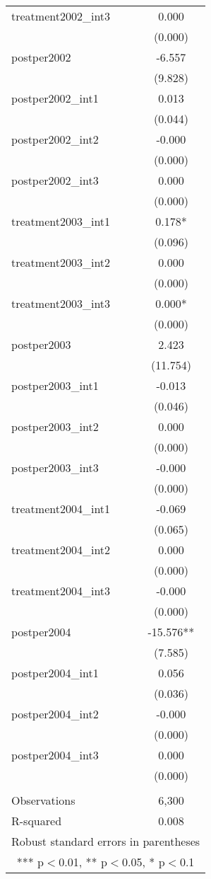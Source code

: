 \documentclass[]{article}
\begin{document}
\begin{tabular}{lc}
treatment2002\_int3 & 0.000 \\
 & (0.000) \\
postper2002 & -6.557 \\
 & (9.828) \\
postper2002\_int1 & 0.013 \\
 & (0.044) \\
postper2002\_int2 & -0.000 \\
 & (0.000) \\
postper2002\_int3 & 0.000 \\
 & (0.000) \\
treatment2003\_int1 & 0.178* \\
 & (0.096) \\
treatment2003\_int2 & 0.000 \\
 & (0.000) \\
treatment2003\_int3 & 0.000* \\
 & (0.000) \\
postper2003 & 2.423 \\
 & (11.754) \\
postper2003\_int1 & -0.013 \\
 & (0.046) \\
postper2003\_int2 & 0.000 \\
 & (0.000) \\
postper2003\_int3 & -0.000 \\
 & (0.000) \\
treatment2004\_int1 & -0.069 \\
 & (0.065) \\
treatment2004\_int2 & 0.000 \\
 & (0.000) \\
treatment2004\_int3 & -0.000 \\
 & (0.000) \\
postper2004 & -15.576** \\
 & (7.585) \\
postper2004\_int1 & 0.056 \\
 & (0.036) \\
postper2004\_int2 & -0.000 \\
 & (0.000) \\
postper2004\_int3 & 0.000 \\
 & (0.000) \\
 &  \\
Observations & 6,300 \\
 R-squared & 0.008 \\ \hline
\multicolumn{2}{c}{ Robust standard errors in parentheses} \\
\multicolumn{2}{c}{ *** p$<$0.01, ** p$<$0.05, * p$<$0.1} \\
\end{tabular}
\end{document}
